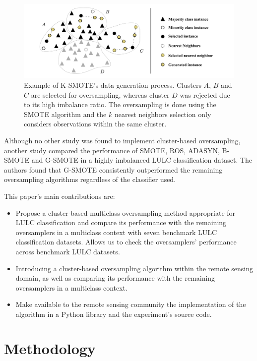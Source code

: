 \documentclass[parskip=full]{scrartcl}
\begin{document}
\begin{figure}[H]
	\centering
	\includegraphics[width=1\linewidth]{../analysis/kmeans_smote_example}
	\caption{Example of K-SMOTE's data generation process. Clusters $A$,
		$B$ and $C$ are selected for
		oversampling, whereas cluster $D$ was rejected due to its
		high imbalance ratio. The oversampling is done using the SMOTE algorithm and
		the $k$ nearest neighbors selection only considers
		observations within the same cluster.}
	\label{fig:kmeans_smote_example}
\end{figure}

Although no other study was found to implement cluster-based oversampling,
another study \cite{Douzas2019rs} compared the performance of SMOTE, ROS,
ADASYN, B-SMOTE and G-SMOTE in a highly imbalanced LULC classification dataset.
The authors found that G-SMOTE consistently outperformed the remaining
oversampling algorithms regardless of the classifier used.

This paper's main contributions are:
\begin{itemize}
    \item Propose a cluster-based multiclass oversampling method appropriate
        for LULC classification and compare its performance with the remaining
        oversamplers in a multiclass context with seven benchmark LULC
        classification datasets. Allows us to check the oversamplers'
        performance across benchmark LULC datasets.
    \item Introducing a cluster-based oversampling algorithm within the remote
        sensing domain, as well as comparing its performance with the remaining
        oversamplers in a multiclass context.
    \item Make available to the remote sensing community the implementation
        of the algorithm in a Python library and the experiment's source code.
\end{itemize}

\section{Methodology}\label{sec:methodology}
\end{document}

